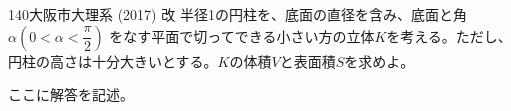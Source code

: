 \begin{prob}{140}{}{大阪市大理系 (2017) 改}
 半径1の円柱を、底面の直径を含み、底面と角$\alpha (0<\alpha<\dfrac{\pi}{2})$ をなす平面で切ってできる小さい方の立体$K$を考える。ただし、円柱の高さは十分大きいとする。$K$の体積$V$と表面積$S$を求めよ。
\end{prob}
ここに解答を記述。